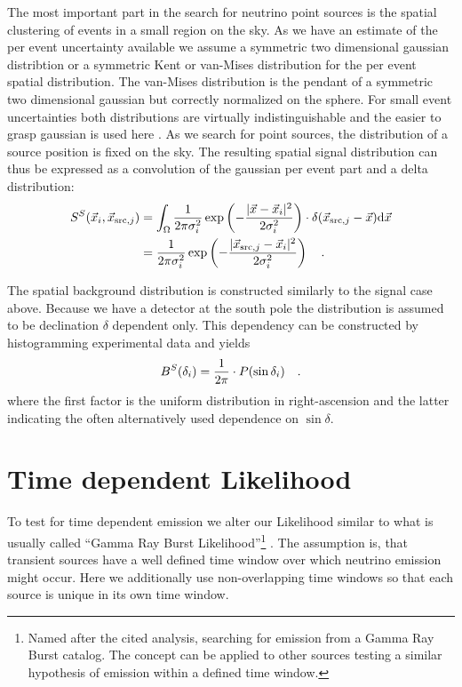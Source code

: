 The most important part in the search for neutrino point sources is the spatial clustering of events in a small region on the sky.
As we have an estimate of the per event uncertainty available we assume a symmetric two dimensional gaussian distribtion or a symmetric Kent or van-Mises distribution  for the per event spatial distribution.
The van-Mises distribution is the pendant of a symmetric two dimensional gaussian but correctly normalized on the sphere.
For small event uncertainties both distributions are virtually indistinguishable and the easier to grasp gaussian is used here .
As we search for point sources, the distribution of a source position is fixed on the sky.
The resulting spatial signal distribution can thus be expressed as a convolution of the gaussian per event part and a delta distribution:
\begin{equation}
  \begin{aligned}
    S^S(\vec{x}_i, \vec{x}_{\mathrm{src},j}) &=
      \int_\Omega \frac{1}{2\pi \sigma_i^2}
      \exp\left(-\frac{|\vec{x}-\vec{x}_i|^2}{2\sigma_i^2}\right) \cdot
      \delta(\vec{x}_{\mathrm{src},j} - \vec{x}) \mathrm{d}\vec{x} \\
      &= \frac{1}{2\pi \sigma_i^2}
         \exp\left(-\frac{|\vec{x}_{\mathrm{src},j}-
                          \vec{x}_i|^2}{2\sigma_i^2}\right)
      \quad\text{.}
  \end{aligned}
\end{equation}

The spatial background distribution is constructed similarly to the signal case above.
Because we have a detector at the south pole the distribution is assumed to be declination $\delta$ dependent only.
This dependency can be constructed by histogramming experimental data and yields
\begin{equation}
  B^S(\delta_i) = \frac{1}{2\pi} \cdot P(\sin\delta_i)
  \quad\text{.}
\end{equation}
where the first factor is the uniform distribution in right-ascension and the latter indicating the often alternatively used dependence on $\sin\delta$.


\section{Time dependent Likelihood}
To test for time dependent emission we alter our Likelihood similar to what is usually called \enquote{Gamma Ray Burst Likelihood}\footnote{Named after the cited analysis, searching for emission from a Gamma Ray Burst catalog. The concept can be applied to other sources testing a similar hypothesis of emission within a defined time window.} .
The assumption is, that transient sources have a well defined time window over which neutrino emission might occur.
Here we additionally use non-overlapping time windows so that each source is unique in its own time window.

